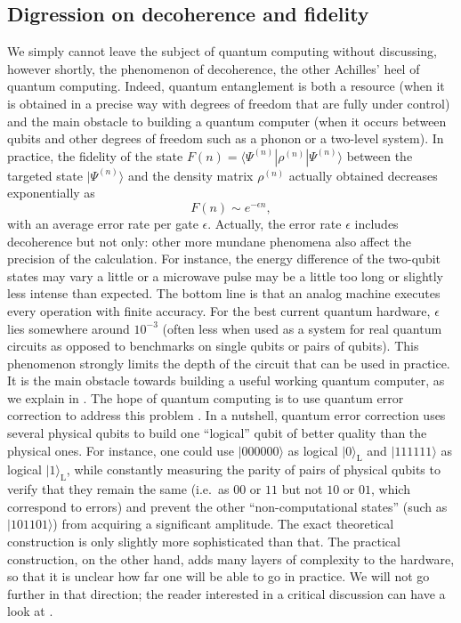 \documentclass{SciPost}
\newcommand{\ket}[1]{|#1\rangle}
\newcommand{\bra}[1]{\langle #1|}
\begin{document}
\subsection{Digression on decoherence and fidelity}
We simply cannot leave the subject of quantum computing without discussing, however shortly, the phenomenon of decoherence, the other Achilles' heel of quantum computing.
Indeed, quantum entanglement is both a resource (when it is obtained in a precise way with degrees of freedom that are fully under control) and the main obstacle to building a quantum computer (when it occurs between qubits and other degrees of freedom such as a phonon or a two-level system).
In practice, the fidelity of the state $F(n) = \bra{\Psi^{(n)}} \rho^{(n)} \ket{\Psi^{(n)}}$ between the targeted state $\ket{\Psi^{(n)}}$ and the density matrix $\rho^{(n)}$ actually obtained decreases exponentially as
\begin{equation}
F(n)\sim e^{-\epsilon n},
\end{equation}
with an average error rate per gate $\epsilon$.
Actually, the error rate $\epsilon$ includes decoherence but not only: other more mundane phenomena also affect the precision of the calculation.
For instance, the energy difference of the two-qubit states may vary a little or a microwave pulse may be a little too long or slightly less intense than expected.
The bottom line is that an analog machine executes every operation with finite accuracy.
For the best current quantum hardware, $\epsilon$ lies somewhere around $10^{-3}$ (often less when used as a system for real quantum circuits as opposed to benchmarks on single qubits or pairs of qubits).
This phenomenon strongly limits the depth of the circuit that can be used in practice.
It is the main obstacle towards building a useful working quantum computer, as we explain in \cite{waintal2024}.
The hope of quantum computing is to use quantum error correction to address this problem \cite{nielsen2000}.
In a nutshell, quantum error correction uses several physical qubits to build one ``logical'' qubit of better quality than the physical ones.
For instance, one could use $\ket{000000}$ as logical $\ket{0}_\text{L}$ and $\ket{111111}$ as logical $\ket{1}_\text{L}$, while constantly measuring the parity of pairs of physical qubits to verify that they remain the same (i.e.\ as $00$ or $11$ but not $10$ or $01$, which correspond to errors) and prevent the other ``non-computational states'' (such as $\ket{101101}$) from acquiring a significant amplitude.
The exact theoretical construction is only slightly more sophisticated than that.
The practical construction, on the other hand, adds many layers of complexity to the hardware, so that it is unclear how far one will be able to go in practice.
We will not go further in that direction; the reader interested in a critical discussion can have a look at \cite{waintal2019}.
\end{document}
